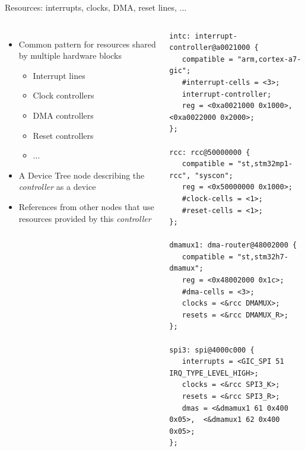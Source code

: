\begin{frame}[fragile]{Resources: interrupts, clocks, DMA, reset lines, ...}
  \begin{columns}
  \begin{itemize}
  \item Common pattern for resources shared by multiple hardware
    blocks
    \begin{itemize}
    \item Interrupt lines
    \item Clock controllers
    \item DMA controllers
    \item Reset controllers
    \item ...
    \end{itemize}
  \item A Device Tree node describing the {\em controller} as a device
  \item References from other nodes that use resources provided by
    this {\em controller}
  \end{itemize}
\begin{block}{}
{\tiny
\begin{verbatim}
intc: interrupt-controller@a0021000 {
   compatible = "arm,cortex-a7-gic";
   #interrupt-cells = <3>;
   interrupt-controller;
   reg = <0xa0021000 0x1000>, <0xa0022000 0x2000>;
};

rcc: rcc@50000000 {
   compatible = "st,stm32mp1-rcc", "syscon";
   reg = <0x50000000 0x1000>;
   #clock-cells = <1>;
   #reset-cells = <1>;
};

dmamux1: dma-router@48002000 {
   compatible = "st,stm32h7-dmamux";
   reg = <0x48002000 0x1c>;
   #dma-cells = <3>;
   clocks = <&rcc DMAMUX>;
   resets = <&rcc DMAMUX_R>;
};

spi3: spi@4000c000 {
   interrupts = <GIC_SPI 51 IRQ_TYPE_LEVEL_HIGH>;
   clocks = <&rcc SPI3_K>;
   resets = <&rcc SPI3_R>;
   dmas = <&dmamux1 61 0x400 0x05>,  <&dmamux1 62 0x400 0x05>;
};
\end{verbatim}
}
\end{block}
\end{columns}
\end{frame}

